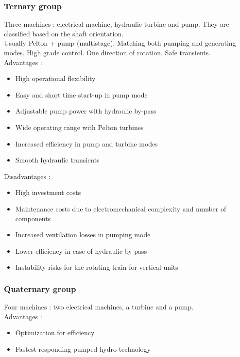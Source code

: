 \documentclass[../main.tex]{subfiles}
\begin{document}
\subsubsection{Ternary group}
Three machines : electrical machine, hydraulic turbine and pump. They are classified based on the shaft orientation.\\
Usually Pelton + pump (multistage). Matching both pumping and generating modes. High grade control. One direction of rotation. Safe transients.\\

Advantages : \begin{itemize}
    \item High operational flexibility
    \item Easy and short time start-up in pump mode
    \item Adjustable pump power with hydraulic by-pass
    \item Wide operating range with Pelton turbines
    \item Increased efficiency in pump and turbine modes
    \item Smooth hydraulic transients
\end{itemize}

Disadvantages : \begin{itemize}
    \item High investment costs
    \item Maintenance costs due to electromechanical complexity and number of components
    \item Increased ventilation losses in pumping mode
    \item Lower efficiency in case of hydraulic by-pass
    \item Instability risks for the rotating train for vertical units
\end{itemize}

\subsubsection{Quaternary group}
Four machines : two electrical machines, a turbine and a pump. \\

Advantages : \begin{itemize}
    \item Optimization for efficiency 
    \item Fastest responding pumped hydro technology
\end{itemize}
\end{document}
